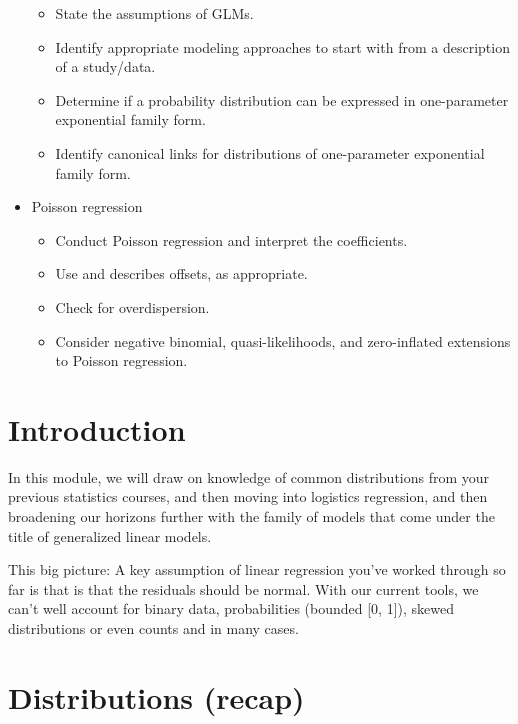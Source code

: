 \documentclass[
  openany]{book}
\begin{document}
\begin{itemize}
  \begin{itemize}
  \item
    State the assumptions of GLMs.
  \item
    Identify appropriate modeling approaches to start with from a
    description of a study/data.
  \item
    Determine if a probability distribution can be expressed in
    one-parameter exponential family form.
  \item
    Identify canonical links for distributions of one-parameter
    exponential family form.
  \end{itemize}
\item
  Poisson regression

  \begin{itemize}
  \item
    Conduct Poisson regression and interpret the coefficients.
  \item
    Use and describes offsets, as appropriate.
  \item
    Check for overdispersion.
  \item
    Consider negative binomial, quasi-likelihoods, and zero-inflated
    extensions to Poisson regression.
  \end{itemize}
\end{itemize}

\hypertarget{introduction-4}{%
\section{Introduction}\label{introduction-4}}

In this module, we will draw on knowledge of common distributions from
your previous statistics courses, and then moving into logistics
regression, and then broadening our horizons further with the family of
models that come under the title of generalized linear models.

This big picture: A key assumption of linear regression you've worked
through so far is that is that the residuals should be normal. With our
current tools, we can't well account for binary data, probabilities
(bounded {[}0, 1{]}), skewed distributions or even counts and in many cases.

\hypertarget{distributions-recap}{%
\section{Distributions (recap)}\label{distributions-recap}}
\end{document}

